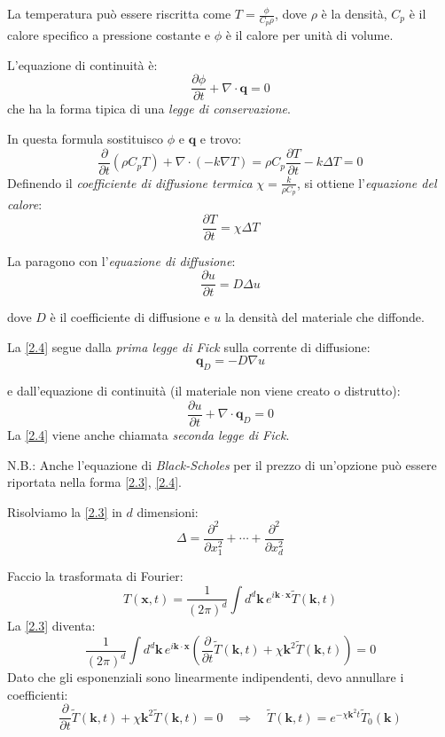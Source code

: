 \documentclass[a4paper,11pt]{report}
\newcommand{\vect}[1]{\boldsymbol{#1}}
\newcommand{\x}{\boldsymbol{x}}
\newcommand{\kk}{\boldsymbol{k}}
\begin{document}
La temperatura pu\`o essere riscritta come $T=\frac{\phi}{C_p \rho}$, dove $\rho$ \`e la densit\`a, $C_p$ \`e il calore specifico a pressione costante e $\phi$ \`e il calore per unit\`a di volume.

L'equazione di continuit\`a \`e:
\begin{equation}
\frac{\partial \phi}{\partial t} + \nabla\cdot\vect{q}=0
\end{equation}
che ha la forma tipica di una \emph{legge di conservazione}.

In questa formula sostituisco $\phi$ e $\vect{q}$ e trovo:
\[
\frac{\partial}{\partial t}(\rho C_p T) + \nabla\cdot(-k\nabla T) = \rho C_p \frac{\partial T}{\partial t} - k \Delta T=0
\]
Definendo il \emph{coefficiente di diffusione termica} $\chi=\frac{k}{\rho C_p}$, si ottiene l'\emph{equazione del calore}:
\begin{equation}
\frac{\partial T}{\partial t}=\chi \Delta T
\label{2.3}
\end{equation}

La paragono con l'\emph{equazione di diffusione}:
\begin{equation}
\frac{\partial u}{\partial t}=D \Delta u
\label{2.4}
\end{equation}

dove $D$ \`e il coefficiente di diffusione e $u$ la densit\`a del materiale che diffonde.

La \eqref{2.4} segue dalla \emph{prima legge di Fick} sulla corrente di diffusione:
\begin{equation}
\vect{q}_{D}=-D{\nabla}u
\end{equation}

e dall'equazione di continuit\`a (il materiale non viene creato o distrutto):
\[
\frac{\partial u}{\partial t}+{\nabla}\cdot\vect{q}_D=0
\]
La \eqref{2.4} viene anche chiamata \emph{seconda legge di Fick}.

N.B.: Anche l'equazione di \emph{Black-Scholes} per il prezzo di un'opzione pu\`o essere riportata nella forma \eqref{2.3}, \eqref{2.4}.

\medskip

Risolviamo la \eqref{2.3} in $d$ dimensioni:
\begin{equation}
\Delta=\frac{\partial^2}{\partial x_{1}^2}+\cdots+\frac{\partial^2}{\partial x_{d}^2} 
\end{equation}

Faccio la trasformata di Fourier:
\begin{equation}
T(\x,t)=\frac{1}{(2\pi)^d}\int d^d\kk\, e^{i\kk\cdot\x}\tilde{T}(\kk,t) 
\label{2.7}
\end{equation}
La \eqref{2.3} diventa:
\[
\frac{1}{(2\pi)^d}\int d^d \kk\, e^{i\kk\cdot\x }\left(\frac{\partial}{\partial t}\tilde{T}(\kk,t) + \chi \kk^2\tilde{T}(\kk,t)\right)=0 
\]
Dato che gli esponenziali sono linearmente indipendenti, devo annullare i coefficienti:
\begin{equation}
\frac{\partial}{\partial t}\tilde{T}(\kk,t) + \chi \kk^2\tilde{T}(\kk,t)=0 \quad\Rightarrow\quad \tilde{T}(\kk,t)=e^{-\chi\kk^2 t}\tilde{T}_0(\kk)
\label{2.8}
\end{equation}
\end{document}
